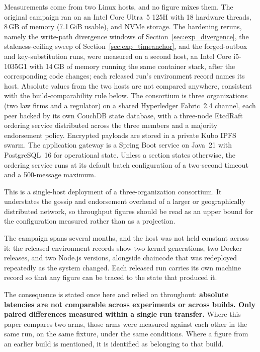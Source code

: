 \documentclass[preprint,12pt]{elsarticle}
\begin{document}
Measurements come from two Linux hosts, and no figure mixes them. The
original campaign ran on an Intel Core Ultra~5 125H with 18 hardware threads,
8\,GB of memory (7.1\,GiB usable), and NVMe storage. The hardening reruns,
namely the write-path divergence windows of Section~\ref{sec:exp_divergence},
the staleness-ceiling sweep of Section~\ref{sec:exp_timeanchor}, and the
forged-outbox and key-substitution runs, were measured on a second host, an
Intel Core i5-1035G1 with 14\,GB of memory running the same container stack,
after the corresponding code changes; each released run's environment record
names its host. Absolute values from the two hosts are not compared anywhere,
consistent with the build-comparability rule below. The consortium is three organizations (two law firms and a
regulator) on a shared Hyperledger Fabric~2.4 channel, each peer backed by its own
CouchDB state database, with a three-node EtcdRaft ordering service distributed
across the three members and a majority endorsement policy. Encrypted payloads
are stored in a private Kubo IPFS swarm. The application gateway is a Spring
Boot service on Java~21 with PostgreSQL~16 for operational state. Unless a
section states otherwise, the ordering service runs at its default batch
configuration of a two-second timeout and a 500-message maximum.

This is a single-host deployment of a three-organization consortium. It
understates the gossip and endorsement overhead of a larger or geographically
distributed network, so throughput figures should be read as an upper bound for
the configuration measured rather than as a projection.

The campaign spans several months, and the host was not held constant across it:
the released environment records show two kernel generations, two Docker
releases, and two Node.js versions, alongside chaincode that was redeployed
repeatedly as the system changed. Each released run carries its own machine
record so that any figure can be traced to the state that produced it.

The consequence is stated once here and relied on throughout: \textbf{absolute
latencies are not comparable across experiments or across builds. Only paired
differences measured within a single run transfer.} Where this paper compares
two arms, those arms were measured against each other in the same run, on the
same fixture, under the same conditions. Where a figure from an earlier build is
mentioned, it is identified as belonging to that build.
\end{document}
